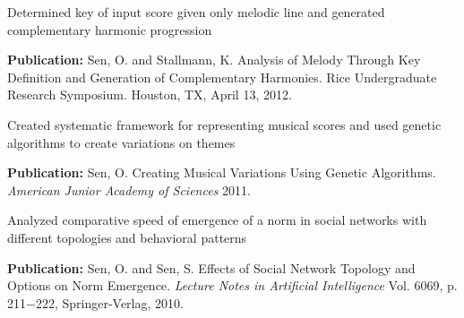 \documentclass{onkursen-resume}
\begin{document}

\begin{itemize*}
\item Determined key of input score given only melodic line and generated complementary harmonic progression
\item {\bf Publication:} Sen, O. and Stallmann, K. Analysis of Melody Through Key Definition and Generation of Complementary Harmonies. Rice Undergraduate Research Symposium. Houston, TX, April 13, 2012.
\end{itemize*}
\vspace{-1mm}


\begin{itemize*}
\item Created systematic framework for representing musical scores and used genetic algorithms to create variations on themes
\item {\bf Publication:} Sen, O. Creating Musical Variations Using Genetic Algorithms. {\em American Junior Academy of Sciences} 2011.
\end{itemize*}
\vspace{-1mm}


\begin{itemize*}
\item Analyzed comparative speed of emergence of a norm in social networks with different topologies and behavioral patterns
\item {\bf Publication:} Sen, O. and Sen, S. Effects of Social Network Topology and Options on Norm Emergence. {\em Lecture Notes in Artificial Intelligence} Vol. 6069, p. 211$-$222, Springer-Verlag, 2010.
\end{itemize*}
 
%
\end{document}
